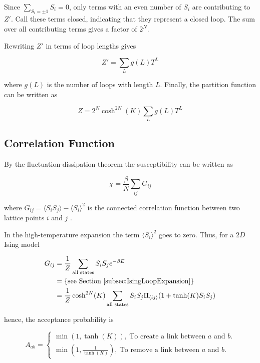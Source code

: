 Since $\sum_{S_i = \pm 1} S_i = 0$, only terms with an even number of $S_i$ are contributing to $Z'$. Call these terms closed, indicating that they represent a closed loop. The sum over all contributing terms gives a factor of $2^N$.

Rewriting $Z'$ in terms of loop lengths gives

\begin{equation}
    Z' = \sum_L g(L) T^L
\end{equation}

where $g(L)$ is the number of loops with length $L$. Finally, the partition function can be written as

\begin{equation}
    Z = 2^N \cosh^{2N} (K) \sum_L g(L) T^L
\end{equation}

\subsection{Correlation Function}
\label{subsec:CorrelationFunction}

By the fluctuation-dissipation theorem the susceptibility can be written as 

\begin{equation}
    \chi = \frac{\beta}{N} \sum_{ij} G_{ij}
\end{equation}

where $G_{ij} = \langle S_i S_j \rangle - \langle S_i \rangle^2$ is the connected correlation function between two lattice points $i$ and $j$ \cite{Chaikin:PrincCondencedMatterPhysics}.

In the high-temperature expansion the term $\langle S_i \rangle^2$ goes to zero. Thus, for a $2D$ Ising model

\begin{align}
    G_{ij} &= \frac{1}{Z} \sum_{\text{all states}} S_i S_j e^{-\beta E} \\
    &= \left \{ \text{see Section \ref{subsec:IsingLoopExpansion}} \right \} \\
    &= \frac{1}{Z} \cosh^{2N} (K) \sum_{\text{all states}} S_i S_j \Pi_{\langle ij \rangle} (1 + \tanh(K) S_i S_j)
\end{align}

hence, the acceptance probability is \cite{Walter:IntroToMC}

\begin{equation}
A_{ab} = \left\{
\begin{array}{ll}
      \min \left (1, \tanh(K)\right), \ \text{To create a link between $a$ and $b$.} \\
      \min \left (1, \frac{1}{\tanh(K)} \right), \ \text{To remove a link between $a$ and $b$.}
\end{array} 
\right. 
\end{equation}



